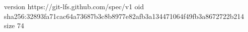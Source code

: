 version https://git-lfs.github.com/spec/v1
oid sha256:32893fa71cac64a73687b3c8b8977e82afb3a134471064f49fb3a8672722b214
size 74

